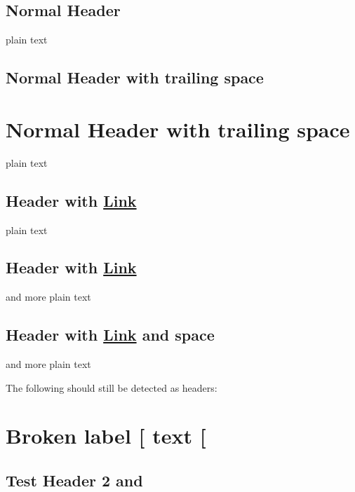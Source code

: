
\def\mytitle{MultiMarkdown Headers Test}
\def\latexmode{memoir}


\section{Normal Header}
\label{normalheader}

plain text

\section{Normal Header with trailing space}
\label{normalheaderwithtrailingspace}

\chapter{Normal Header with trailing space}
\label{normalheaderwithtrailingspace}

plain text

\section{Header with \href{http://www.google.com}{Link}}
\label{headerwithlink}

plain text

\section{Header with \href{http://www.google.com}{Link}}
\label{headerwithlink}

and more plain text

\section{Header with \href{http://www.google.com}{Link} and space}
\label{headerwithlinkandspace}

and more plain text

The following should still be detected as headers:

\chapter{Broken label [ text [}
\label{brokenlabeltext}

\section{Test Header 2 and}
\label{label}

